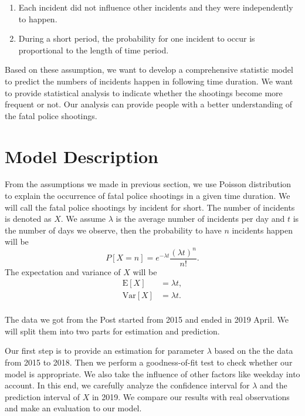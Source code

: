 \documentclass[11pt,a4paper,english]{article}
\begin{document}
\begin{enumerate}
    \item Each incident did not influence other incidents and they were independently to happen.
    \item During a short period, the probability for one incident to occur is proportional to the length of time period. 
\end{enumerate}
Based on these assumption, we want to develop a comprehensive statistic model to predict the numbers of incidents happen in following time duration. We want to provide statistical analysis to indicate whether the shootings become more frequent or not. Our analysis can provide people with a better understanding of the fatal police shootings.
\section{Model Description}
From the assumptions we made in previous section, we use Poisson distribution to explain the occurrence of fatal police shootings in a given time duration. 
We will call the fatal police shootings by incident for short. 
The number of incidents is denoted as $X$. We assume $\lambda$ is the average number of incidents per day and $t$ is the number of days we observe, then the probability to have $n$ incidents happen will be 
\[P[X = n] = e^{-\lambda t}\frac{(\lambda t)^{n}}{n!}.\]
The expectation and variance of $X$ will be 
\[
    \begin{aligned}
        \text{E}[X] &= \lambda t,\\
        \text{Var}[X]&= \lambda t.\\
    \end{aligned}
\]

The data we got from the Post started from 2015 and ended in 2019 April. We will split them into two parts for estimation and prediction.

Our first step is to provide an estimation for parameter $\lambda$ based on the the data from 2015 to 2018. 
Then we perform a goodness-of-fit test to check whether our model is appropriate. 
We also take the influence of other factors like weekday into account. 
In this end, we carefully analyze the confidence interval for $\lambda$ and the prediction interval of $X$ in 2019. 
We compare our results with real observations and make an evaluation to our model. 
\end{document}
